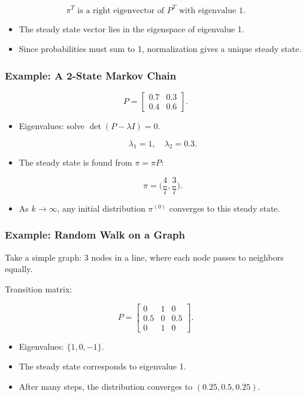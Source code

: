 \documentclass[
  letterpaper,
  DIV=11,
  numbers=noendperiod]{scrreprt}
\providecommand{\tightlist}{%
  \setlength{\itemsep}{0pt}\setlength{\parskip}{0pt}}
\begin{document}
\[
\pi^T \text{ is a right eigenvector of } P^T \text{ with eigenvalue } 1.
\]

\begin{itemize}
\tightlist
\item
  The steady state vector lies in the eigenspace of eigenvalue 1.
\item
  Since probabilities must sum to 1, normalization gives a unique steady
  state.
\end{itemize}

\subsubsection{Example: A 2-State Markov
Chain}\label{example-a-2-state-markov-chain}

\[
P = \begin{bmatrix} 0.7 & 0.3 \\ 0.4 & 0.6 \end{bmatrix}.
\]

\begin{itemize}
\item
  Eigenvalues: solve \(\det(P-\lambda I) = 0\).

  \[
  \lambda_1 = 1, \quad \lambda_2 = 0.3.
  \]
\item
  The steady state is found from \(\pi = \pi P\):

  \[
  \pi = \bigg(\frac{4}{7}, \frac{3}{7}\bigg).
  \]
\item
  As \(k \to \infty\), any initial distribution \(\pi^{(0)}\) converges
  to this steady state.
\end{itemize}

\subsubsection{Example: Random Walk on a
Graph}\label{example-random-walk-on-a-graph}

Take a simple graph: 3 nodes in a line, where each node passes to
neighbors equally.

Transition matrix:

\[
P = \begin{bmatrix} 
0 & 1 & 0 \\ 
0.5 & 0 & 0.5 \\ 
0 & 1 & 0 
\end{bmatrix}.
\]

\begin{itemize}
\tightlist
\item
  Eigenvalues: \(\{1, 0, -1\}\).
\item
  The steady state corresponds to eigenvalue 1.
\item
  After many steps, the distribution converges to \((0.25, 0.5, 0.25)\).
\end{itemize}
\end{document}
